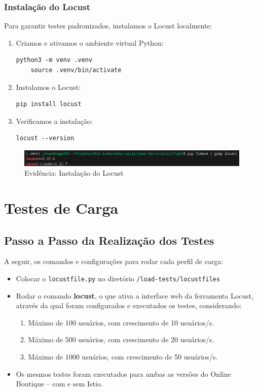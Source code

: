 \documentclass[12pt,a4paper]{report}
\begin{document}
\subsection{Instalação do Locust}
Para garantir testes padronizados, instalamos o Locust localmente:
\begin{enumerate}
  \item Criamos e ativamos o ambiente virtual Python:
    \begin{lstlisting}[style=shell]
    python3 -m venv .venv
    source .venv/bin/activate
    \end{lstlisting}
  \item Instalamos o Locust:
    \begin{lstlisting}[style=shell]
    pip install locust
    \end{lstlisting}
  \item Verificamos a instalação:
    \begin{lstlisting}[style=shell]
    locust --version
    \end{lstlisting}
\end{enumerate}

\begin{figure}[h]
    \centering
    \includegraphics[width=1\linewidth]{figures/evidence-locust.png}
    \caption{Evidência: Instalação do Locust}
    \label{fig:locust}
\end{figure}

\chapter{Testes de Carga}

\section{Passo a Passo da Realização dos Testes}
A seguir, os comandos e configurações para rodar cada perfil de carga:
\begin{itemize}
  \item Colocar o \texttt{locustfile.py} no diretório \texttt{/load-tests/locustfiles}
  \item Rodar o comando \textbf{locust}, o que ativa a interface web da ferramenta Locust, através da qual foram configurados e executados os testes, considerando:
  \begin{enumerate}
      \item Máximo de 100 usuários, com crescimento de 10 usuários/s.
      \item Máximo de 500 usuários, com crescimento de 20 usuários/s.
      \item Máximo de 1000 usuários, com crescimento de 50 usuários/s.
  \end{enumerate}
  \item Os mesmos testes foram executados para ambas as versões do Online Boutique -- com e sem Istio.
\end{itemize}
\end{document}
